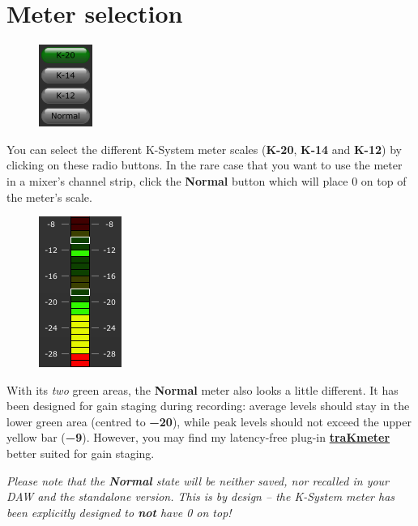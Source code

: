 \section{Meter selection}

\begin{figure}
  \includegraphics[scale=\screenshotscale,clip]{include/images/button_meter_selection.png}
\end{figure}

You can select the different K-System meter scales (\textbf{K-20},
\textbf{K-14} and \textbf{K-12}) by clicking on these radio buttons.
In the rare case that you want to use the meter in a mixer's channel
strip, click the \textbf{Normal} button which will place \SI{0}{\dBFS}
on top of the meter's scale.

\begin{figure}
  \includegraphics[scale=0.49,clip]{include/images/kmeter_normal_scale.png}
\end{figure}

With its \emph{two} green areas, the \textbf{Normal} meter also looks
a little different.  It has been designed for gain staging during
recording: average levels should stay in the lower green area (centred
to \textbf{\SI{-20}{\dBFS}}), while peak levels should not exceed the
upper yellow bar (\textbf{\SI{-9}{\dBFS}}).  However, you may find my
latency-free plug-in
\href{http://code.mzuther.de/}{\textbf{traKmeter}} better suited for
gain staging.

\emph{Please note that the \textbf{Normal} state will be neither
  saved, nor recalled in your DAW and the standalone version.  This is
  by design -- the K-System meter has been explicitly designed to
  \textbf{not} have \SI{0}{\dBFS} on top!}

